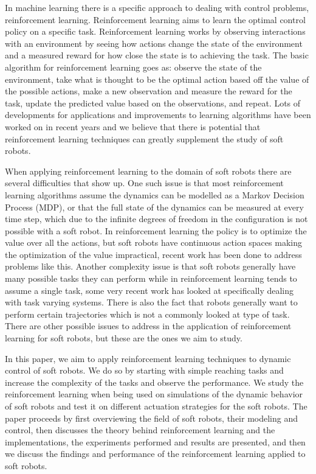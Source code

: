 \documentclass[letterpaper, 10 pt, conference]{ieeeconf}  %
\begin{document}
In machine learning there is a specific approach to dealing with control problems, reinforcement learning. Reinforcement learning aims to learn the optimal control policy on a specific task. Reinforcement learning works by observing interactions with an environment by seeing how actions change the state of the environment and a measured reward for how close the state is to achieving the task. The basic algorithm for reinforcement learning goes as: observe the state of the environment, take what is thought to be the optimal action based off the value of the possible actions, make a new observation and measure the reward for the task, update the predicted value based on the observations, and repeat. Lots of developments for applications and improvements to learning algorithms have been worked on in recent years and we believe that there is potential that reinforcement learning techniques can greatly supplement the study of soft robots.

When applying reinforcement learning to the domain of soft robots there are several difficulties that show up. One such issue is that most reinforcement learning algorithms assume the dynamics can be modelled as a Markov Decision Process (MDP), or that the full state of the dynamics can be measured at every time step, which due to the infinite degrees of freedom in the configuration is not possible with a soft robot. In reinforcement learning the policy is to optimize the value over all the actions, but soft robots have continuous action spaces making the optimization of the value impractical, recent work has been done to address problems like this. Another complexity issue is that soft robots generally have many possible tasks they can perform while in reinforcement learning tends to assume a single task, some very recent work has looked at specifically dealing with task varying systems. There is also the fact that robots generally want to perform certain trajectories which is not a commonly looked at type of task. There are other possible issues to address in the application of reinforcement learning for soft robots, but these are the ones we aim to study.

In this paper, we aim to apply reinforcement learning techniques to dynamic control of soft robots. We do so by starting with simple reaching tasks and increase the complexity of the tasks and observe the performance. We study the reinforcement learning when being used on simulations of the dynamic behavior of soft robots and test it on different actuation strategies for the soft robots. The paper proceeds by first overviewing the field of soft robots, their modeling and control, then discusses the theory behind reinforcement learning and the implementations, the experiments performed and results are presented, and then we discuss the findings and performance of the reinforcement learning applied to soft robots.
\end{document}
